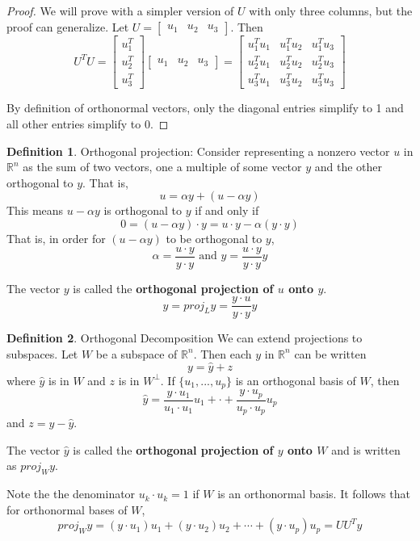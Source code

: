 \documentclass[letterpaper]{article}
\theoremstyle{definition}
\newtheorem{definition}{Definition}[section]
\begin{document}
\begin{proof}
We will prove with a simpler version of $U$ with only three columns, but the proof can generalize. Let $U = \begin{bmatrix}
u_1 & u_2 & u_3
\end{bmatrix}$. Then 
$$U^T U = \begin{bmatrix}
u_{1}^{T} \\
u_{2}^{T} \\
u_{3}^{T}
\end{bmatrix} \begin{bmatrix}
u_1 & u_2 & u_3
\end{bmatrix} = \begin{bmatrix}
u_{1}^{T} u_{1} & u_{1}^{T} u_{2} & u_{1}^{T} u_{3} \\
u_{2}^{T} u_{1} & u_{2}^{T} u_{2} & u_{2}^{T} u_{3} \\
u_{3}^{T} u_{1} & u_{3}^{T} u_{2} & u_{3}^{T} u_{3}
\end{bmatrix}$$

By definition of orthonormal vectors, only the diagonal entries simplify to 1 and all other entries simplify to 0. 
\end{proof}

\begin{definition}{Orthogonal projection: }
Consider representing a nonzero vector $u$ in $\mathbb{R}^n$ as the sum of two vectors, one a multiple of some vector $y$ and the other orthogonal to $y$. That is, 
$$u = \alpha y + (u - \alpha y)$$
This means $u - \alpha y$ is orthogonal to $y$ if and only if 
$$ 0 = (u - \alpha y) \cdot y = u \cdot y - \alpha (y \cdot y)$$
That is, in order for $(u - \alpha y)$ to be orthogonal to $y$, 
$$\alpha = \frac{u \cdot y}{y \cdot y} \text{ and } y = \frac{u \cdot y}{y \cdot y} y$$

The vector $y$ is called the \textbf{orthogonal projection of $u$ onto $y$}. 
$$ y = proj_{L} y = \frac{y \cdot u}{y \cdot y} y$$
\end{definition}

\begin{definition} {Orthogonal Decomposition}
We can extend projections to subspaces. Let $W$ be a subspace of $\mathbb{R}^n$. Then each $y$ in $\mathbb{R}^n$ can be written 
$$y = \hat{y} + z $$
where $\hat{y}$ is in $W$ and $z$ is in $W^{\perp}$. If $\{ u_1 , ..., u_p \}$ is an orthogonal basis of $W$, then 
$$\hat{y} = \frac{y \cdot u_1}{u_1 \cdot u_1} u_1 + \cdot + \frac{y \cdot u_p}{u_p \cdot u_p} u_p$$
and $z = y - \hat{y}$. 

The vector $\hat{y}$ is called the \textbf{orthogonal projection of $y$ onto $W$} and is written as $proj_{W} y$.

Note the the denominator $u_k \cdot u_k = 1$ if $W$ is an orthonormal basis. It follows that for orthonormal bases of $W$, 
$$proj_{W}y = (y \cdot u_1) u_1 + (y \cdot u_2)u_2 + \cdots + (y \cdot u_p) u_p = UU^{T}y$$ 
\end{definition}
\end{document}
